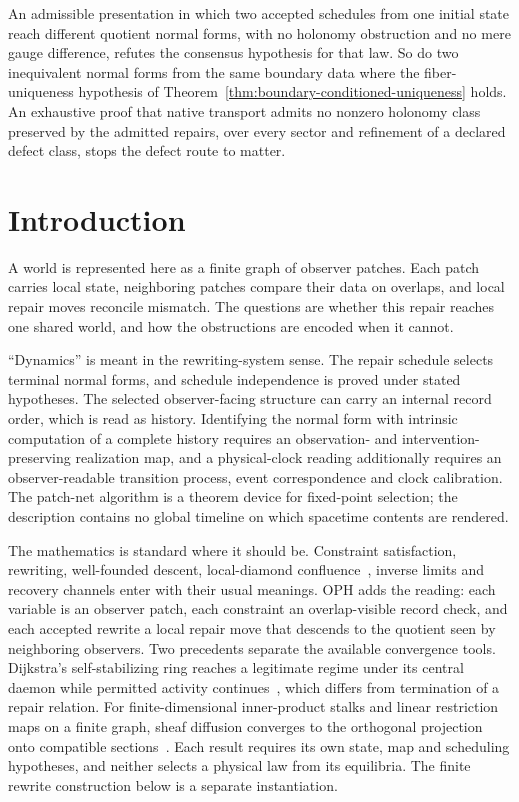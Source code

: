 \documentclass[11pt]{article}
\theoremstyle{remark}
\theoremstyle{plain}
\begin{document}
An admissible presentation in which two accepted schedules from one initial
state reach different quotient normal forms, with no holonomy obstruction
and no mere gauge difference, refutes the consensus hypothesis for that law.
So do two inequivalent normal forms from the same boundary data where the
fiber-uniqueness hypothesis of
Theorem~\ref{thm:boundary-conditioned-uniqueness} holds. An exhaustive
proof that native transport admits no nonzero holonomy class preserved by
the admitted repairs, over every sector and refinement of a declared defect
class, stops the defect route to matter.



\section{Introduction}

A world is represented here as a finite graph of observer patches. Each
patch carries local state, neighboring patches compare their data on
overlaps, and local repair moves reconcile mismatch. The questions are
whether this repair reaches one shared world, and how the obstructions are
encoded when it cannot.

``Dynamics'' is meant in the rewriting-system sense. The repair schedule
selects terminal normal forms, and schedule independence is proved under
stated hypotheses. The selected observer-facing structure can carry an
internal record order, which is read as history. Identifying the normal
form with intrinsic computation of a complete history requires an
observation- and intervention-preserving realization map, and a
physical-clock reading additionally requires an observer-readable
transition process, event correspondence and clock calibration. The
patch-net algorithm is a theorem device for fixed-point selection; the
description contains no global timeline on which spacetime contents are
rendered.

The mathematics is standard where it should be. Constraint satisfaction,
rewriting, well-founded descent, local-diamond confluence~\cite{newman42},
inverse limits and recovery channels enter with their usual meanings. OPH
adds the reading: each variable is an observer patch, each constraint an
overlap-visible record check, and each accepted rewrite a local repair move
that descends to the quotient seen by neighboring observers. Two precedents
separate the available convergence tools. Dijkstra's self-stabilizing ring
reaches a legitimate regime under its central daemon while permitted
activity continues~\cite{dijkstra1974}, which differs from termination of a
repair relation. For finite-dimensional inner-product stalks and linear
restriction maps on a finite graph, sheaf diffusion converges to the
orthogonal projection onto compatible sections~\cite{hansenghrist2020}.
Each result requires its own state, map and scheduling hypotheses, and
neither selects a physical law from its equilibria. The finite rewrite
construction below is a separate instantiation.
\end{document}
